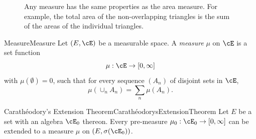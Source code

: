 \begin{figure}[H]
	\centering
	\caption{Any measure has the same properties as the area measure. For example, the total area of the non-overlapping triangles is the sum of the areas of the individual triangles.}
	\label{fig:MeasureProperties}
\end{figure}

\begin{defn}{Measure}{Measure}
	Let $(E, \cE)$ be a measurable space. A \textit{measure} $\mu$ on $\cE$ is a set function
	\begin{equation*}
		\mu : \cE \to [0, \infty]
	\end{equation*}
	with $\mu(\emptyset) = 0$, such that for every sequence $(A_n)$ of disjoint sets in $\cE$,
	\begin{equation}
		\mu(\cup_n A_n) = \sum_n \mu(A_n).
		\label{eq:SigmaAdditivity}
	\end{equation}
\end{defn}


\begin{thm}{Carathéodory's Extension Theorem}{CarathéodorysExtensionTheorem}
	Let $E$ be a set with an algebra $\cE_0$ thereon. Every pre-measure $\mu_0 : \cE_0 \to [0, \infty]$ can be extended to a measure $\mu$ on $(E, \sigma(\cE_0))$.
\end{thm}

